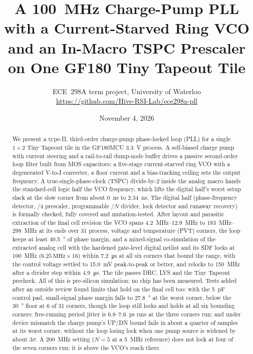 \documentclass[10pt,twocolumn,letterpaper]{article}
\title{\Large\bfseries A \SI{100}{MHz} Charge-Pump PLL with a Current-Starved Ring VCO\\
and an In-Macro TSPC Prescaler on One GF180 Tiny Tapeout Tile}
\author{ECE~298A term project, University of Waterloo\\
\small\url{https://github.com/Hive-RSI-Lab/ece298a-pll}}
\date{November 4, 2026}
\begin{document}
\maketitle

\begin{abstract}
We present a type-II, third-order charge-pump phase-locked loop (PLL) for a
single $1\times2$ Tiny Tapeout tile in the GF180MCU \SI{3.3}{V} process. A
self-biased charge pump with current steering and a rail-to-rail dump-node
buffer drives a passive second-order loop filter built from MOS capacitors;
a five-stage current-starved ring VCO with a degenerated V-to-I converter, a
floor current and a bias-tracking ceiling sets the output frequency. A
true-single-phase-clock (TSPC) divide-by-2 inside the analog macro hands the
standard-cell logic half the VCO frequency, which lifts the digital half's
worst setup slack at the slow corner from about \SI{0}{ns} to
\SI{+2.34}{ns}. The digital half (phase-frequency detector, /4 prescaler,
programmable /$N$ divider, lock detector and runaway recovery) is formally
checked, fully covered and mutation-tested. After layout and parasitic
extraction of the final cell revision the VCO spans
\SIrange{4.2}{12.9}{MHz} to \SIrange{183}{298}{MHz} at its ends over 31
process, voltage and temperature (PVT) corners, the loop keeps at least
\SI{40.5}{\degree} of phase margin, and a mixed-signal co-simulation of the
extracted analog cell with the hardened gate-level digital netlist and its
SDF locks at \SI{100}{MHz} ($6.25\,\text{MHz}\times16$) within
\SI{7.2}{\micro s} at all six corners that bound the range, with the control
voltage settled to \SI{15.0}{mV} peak-to-peak or better, and relocks to
\SI{150}{MHz} after a divider step within \SI{4.9}{\micro s}. The tile passes
DRC, LVS and the Tiny Tapeout precheck. All of this is pre-silicon
simulation: no chip has been measured. Tests added after an outside review
found limits that hold on the final cell too: with the \SI{5}{pF} control
pad, small-signal phase margin falls to \SI{27.8}{\degree} at the worst
corner, below the \SI{30}{\degree} floor at 6 of 31 corners, though the loop
still locks and holds at all six bounding corners; free-running period
jitter is 6.8--\SI{7.6}{ps} rms at the three corners run; and under device
mismatch the charge pump's UP/DN bound fails in about a quarter of samples
at its worst corner, without the loop losing lock when one pump source is
widened by about $3\sigma$. A \SI{200}{MHz} setting ($N=5$ at a
\SI{5}{MHz} reference) does not lock at four of the seven corners run: it is
above the VCO's reach there.
\end{abstract}
\end{document}
